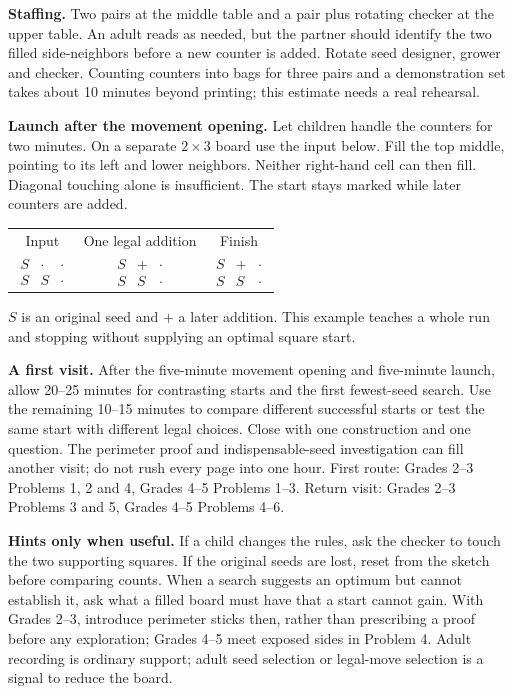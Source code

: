 \documentclass[11pt]{article}
\begin{document}
\textbf{Staffing.} Two pairs at the middle table and a pair plus rotating checker at the upper table. An adult reads as needed, but the partner should identify the two filled side-neighbors before a new counter is added. Rotate seed designer, grower and checker. Counting counters into bags for three pairs and a demonstration set takes about 10 minutes beyond printing; this estimate needs a real rehearsal.

\textbf{Launch after the movement opening.} Let children handle the counters for two minutes. On a separate $2\times3$ board use the input below. Fill the top middle, pointing to its left and lower neighbors. Neither right-hand cell can then fill. Diagonal touching alone is insufficient. The start stays marked while later counters are added.
\begin{center}
\begin{tabular}{ccc}
Input & One legal addition & Finish\\[3pt]
$\begin{matrix}S&\cdot&\cdot\\S&S&\cdot\end{matrix}$ &
$\begin{matrix}S&+&\cdot\\S&S&\cdot\end{matrix}$ &
$\begin{matrix}S&+&\cdot\\S&S&\cdot\end{matrix}$
\end{tabular}
\end{center}
$S$ is an original seed and $+$ a later addition. This example teaches a whole run and stopping without supplying an optimal square start.

\textbf{A first visit.} After the five-minute movement opening and five-minute launch, allow 20--25 minutes for contrasting starts and the first fewest-seed search. Use the remaining 10--15 minutes to compare different successful starts or test the same start with different legal choices. Close with one construction and one question. The perimeter proof and indispensable-seed investigation can fill another visit; do not rush every page into one hour. First route: Grades 2--3 Problems 1, 2 and 4, Grades 4--5 Problems 1--3. Return visit: Grades 2--3 Problems 3 and 5, Grades 4--5 Problems 4--6.

\textbf{Hints only when useful.} If a child changes the rules, ask the checker to touch the two supporting squares. If the original seeds are lost, reset from the sketch before comparing counts. When a search suggests an optimum but cannot establish it, ask what a filled board must have that a start cannot gain. With Grades 2--3, introduce perimeter sticks then, rather than prescribing a proof before any exploration; Grades 4--5 meet exposed sides in Problem 4. Adult recording is ordinary support; adult seed selection or legal-move selection is a signal to reduce the board.


\end{document}

